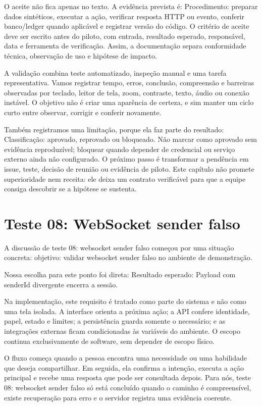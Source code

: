 \documentclass[12pt,oneside,a4paper,article]{abntex2}
\begin{document}
O aceite não fica apenas no texto. A evidência prevista é: Procedimento: preparar dados sintéticos, executar a ação, verificar resposta HTTP ou evento, conferir banco/ledger quando aplicável e registrar versão do código. O critério de aceite deve ser escrito antes do piloto, com entrada, resultado esperado, responsável, data e ferramenta de verificação. Assim, a documentação separa conformidade técnica, observação de uso e hipótese de impacto.

A validação combina teste automatizado, inspeção manual e uma tarefa representativa. Vamos registrar tempo, erros, conclusão, compreensão e barreiras observadas por teclado, leitor de tela, zoom, contraste, texto, áudio ou conexão instável. O objetivo não é criar uma aparência de certeza, e sim manter um ciclo curto entre observar, corrigir e conferir novamente.

Também registramos uma limitação, porque ela faz parte do resultado: Classificação: aprovado, reprovado ou bloqueado. Não marcar como aprovado sem evidência reproduzível; bloquear quando depender de credencial ou serviço externo ainda não configurado. O próximo passo é transformar a pendência em issue, teste, decisão de reunião ou evidência de piloto. Este capítulo não promete superioridade nem receita: ele deixa um contrato verificável para que a equipe consiga descobrir se a hipótese se sustenta.

\section{Teste 08: WebSocket sender falso}
A discussão de teste 08: websocket sender falso começou por uma situação concreta: objetivo: validar websocket sender falso no ambiente de demonstração.

Nossa escolha para este ponto foi direta: Resultado esperado: Payload com senderId divergente encerra a sessão.

Na implementação, este requisito é tratado como parte do sistema e não como uma tela isolada. A interface orienta a próxima ação; a API confere identidade, papel, estado e limites; a persistência guarda somente o necessário; e as integrações externas ficam condicionadas às variáveis do ambiente. O escopo continua exclusivamente de software, sem depender de escopo físico.

O fluxo começa quando a pessoa encontra uma necessidade ou uma habilidade que deseja compartilhar. Em seguida, ela confirma a intenção, executa a ação principal e recebe uma resposta que pode ser consultada depois. Para nós, teste 08: websocket sender falso só está concluído quando o caminho é compreensível, existe recuperação para erro e o servidor registra uma evidência coerente.
\end{document}
